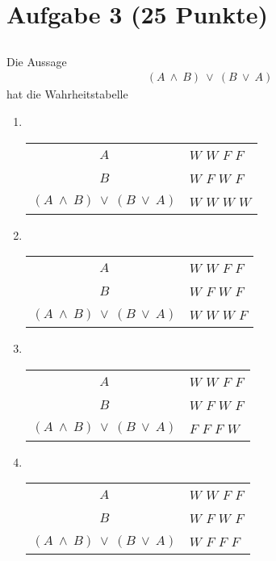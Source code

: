 \section*{Aufgabe 3 (25 Punkte)}
\vspace{0.4cm}
\subsection*{}
Die Aussage
\begin{align*}
(A \ \wedge \ B) \ \vee \ (B \ \vee \ A)
\end{align*}
hat die Wahrheitstabelle
\renewcommand{\labelenumi}{(\alph{enumi})}
\begin{enumerate}
\item 
\ 
\ 
\
\
\
\begin{tabular}{cllll}
\hline
\multicolumn{1}{c|}{$A$} & \multicolumn{4}{l}{$W$ $W$ $F$ $F$} \\
\multicolumn{1}{c|}{$B$} & \multicolumn{4}{l}{$W$ $F$ $W$ $F$} \\ \hline
\multicolumn{1}{c|}{$(A \ \wedge \ B) \ \vee \ (B \ \vee \ A)$} & \multicolumn{4}{l}{$W$ $W$ $W$ $W$}  \\ \hline
\end{tabular}


\item
\ 
\ 
\
\
\
\begin{tabular}{cllll}
\hline
\multicolumn{1}{c|}{$A$} & \multicolumn{4}{l}{$W$ $W$ $F$ $F$} \\
\multicolumn{1}{c|}{$B$} & \multicolumn{4}{l}{$W$ $F$ $W$ $F$} \\ \hline
\multicolumn{1}{c|}{$(A \ \wedge \ B) \ \vee \ (B \ \vee \ A)$} & \multicolumn{4}{l}{$W$ $W$ $W$ $F$}  \\ \hline
\end{tabular} 
\item
\ 
\ 
\
\
\
\begin{tabular}{cllll}
\hline
\multicolumn{1}{c|}{$A$} & \multicolumn{4}{l}{$W$ $W$ $F$ $F$} \\
\multicolumn{1}{c|}{$B$} & \multicolumn{4}{l}{$W$ $F$ $W$ $F$} \\ \hline
\multicolumn{1}{c|}{$(A \ \wedge \ B) \ \vee \ (B \ \vee \ A)$} & \multicolumn{4}{l}{$F$ $F$ $F$ $W$}  \\ \hline
\end{tabular} 
\item 
\ 
\ 
\
\
\
\begin{tabular}{cllll}
\hline
\multicolumn{1}{c|}{$A$} & \multicolumn{4}{l}{$W$ $W$ $F$ $F$} \\
\multicolumn{1}{c|}{$B$} & \multicolumn{4}{l}{$W$ $F$ $W$ $F$} \\ \hline
\multicolumn{1}{c|}{$(A \ \wedge \ B) \ \vee \ (B \ \vee \ A)$} & \multicolumn{4}{l}{$W$ $F$ $F$ $F$}  \\ \hline
\end{tabular}
\end{enumerate}
